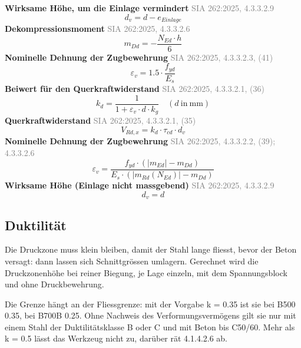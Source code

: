 \documentclass[11pt,a4paper]{article}
\newcommand{\normref}[1]{{\small\textcolor{gray}{#1}}}
\begin{document}
\noindent\textbf{Wirksame Höhe, um die Einlage vermindert} \hfill \normref{SIA 262:2025, 4.3.3.2.9}
\begin{equation*}
d_v = d - e_{Einlage}
\end{equation*}
\noindent\textbf{Dekompressionsmoment} \hfill \normref{SIA 262:2025, 4.3.3.2.6}
\begin{equation*}
m_{Dd} = -\frac{N_{Ed} \cdot h}{6}
\end{equation*}
\noindent\textbf{Nominelle Dehnung der Zugbewehrung} \hfill \normref{SIA 262:2025, 4.3.3.2.3, (41)}
\begin{equation*}
\varepsilon_v = 1.5 \cdot \frac{f_{yd}}{E_s}
\end{equation*}
\noindent\textbf{Beiwert für den Querkraftwiderstand} \hfill \normref{SIA 262:2025, 4.3.3.2.1, (36)}
\begin{equation*}
k_d = \frac{1}{1 + \varepsilon_v \cdot d \cdot k_g} \quad \left(d\ \text{in}\ \mathrm{mm}\right)
\end{equation*}
\noindent\textbf{Querkraftwiderstand} \hfill \normref{SIA 262:2025, 4.3.3.2.1, (35)}
\begin{equation*}
V_{Rd,x} = k_d \cdot \tau_{cd} \cdot d_v
\end{equation*}
\noindent\textbf{Nominelle Dehnung der Zugbewehrung} \hfill \normref{SIA 262:2025, 4.3.3.2.2, (39); 4.3.3.2.6}
\begin{equation*}
\varepsilon_v = \frac{f_{yd} \cdot \left(\left|m_{Ed}\right| - m_{Dd}\right)}{E_s \cdot \left(\left|m_{Rd}(N_{Ed})\right| - m_{Dd}\right)}
\end{equation*}
\noindent\textbf{Wirksame Höhe (Einlage nicht massgebend)} \hfill \normref{SIA 262:2025, 4.3.3.2.9}
\begin{equation*}
d_v = d
\end{equation*}
\subsection{Duktilität}
Die Druckzone muss klein bleiben, damit der Stahl lange fliesst, bevor der Beton versagt: dann lassen sich Schnittgrössen umlagern. Gerechnet wird die Druckzonenhöhe bei reiner Biegung, je Lage einzeln, mit dem Spannungsblock und ohne Druckbewehrung.

Die Grenze hängt an der Fliessgrenze: mit der Vorgabe k = 0.35 ist sie bei B500 0.35, bei B700B 0.25. Ohne Nachweis des Verformungsvermögens gilt sie nur mit einem Stahl der Duktilitätsklasse B oder C und mit Beton bis C50/60. Mehr als k = 0.5 lässt das Werkzeug nicht zu, darüber rät 4.1.4.2.6 ab.
\end{document}
